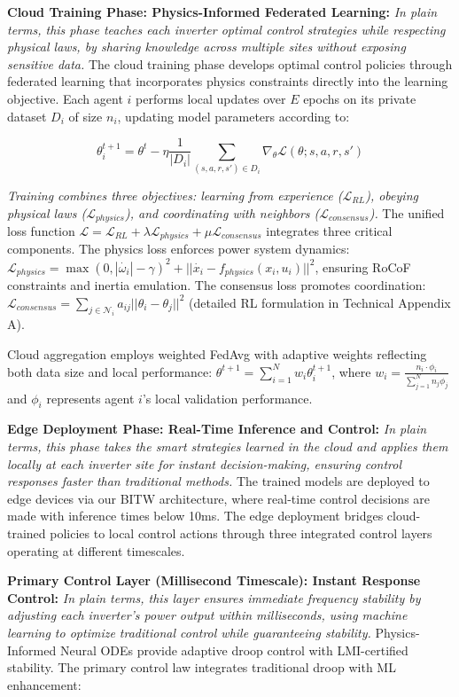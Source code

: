 \documentclass[12pt]{article}
\begin{document}
\textbf{Cloud Training Phase: Physics-Informed Federated Learning:} \textit{In plain terms, this phase teaches each inverter optimal control strategies while respecting physical laws, by sharing knowledge across multiple sites without exposing sensitive data.} The cloud training phase develops optimal control policies through federated learning that incorporates physics constraints directly into the learning objective. Each agent $i$ performs local updates over $E$ epochs on its private dataset $D_i$ of size $n_i$, updating model parameters according to:

$$\theta_i^{t+1} = \theta^t - \eta \frac{1}{|D_i|} \sum_{(s,a,r,s') \in D_i} \nabla_{\theta} \mathcal{L}(\theta; s, a, r, s')$$

\textit{Training combines three objectives: learning from experience ($\mathcal{L}_{RL}$), obeying physical laws ($\mathcal{L}_{physics}$), and coordinating with neighbors ($\mathcal{L}_{consensus}$).} The unified loss function $\mathcal{L} = \mathcal{L}_{RL} + \lambda \mathcal{L}_{physics} + \mu \mathcal{L}_{consensus}$ integrates three critical components. The physics loss enforces power system dynamics: $\mathcal{L}_{physics} = \max(0, |\dot{\omega_i}| - \gamma)^2 + ||\dot{x_i} - f_{physics}(x_i, u_i)||^2$, ensuring RoCoF constraints and inertia emulation. The consensus loss promotes coordination: $\mathcal{L}_{consensus} = \sum_{j \in \mathcal{N}_i} a_{ij} ||\theta_i - \theta_j||^2$ (detailed RL formulation in Technical Appendix A).

Cloud aggregation employs weighted FedAvg with adaptive weights reflecting both data size and local performance: $\theta^{t+1} = \sum_{i=1}^N w_i \theta_i^{t+1}$, where $w_i = \frac{n_i \cdot \phi_i}{\sum_{j=1}^N n_j \phi_j}$ and $\phi_i$ represents agent $i$'s local validation performance.

\textbf{Edge Deployment Phase: Real-Time Inference and Control:} \textit{In plain terms, this phase takes the smart strategies learned in the cloud and applies them locally at each inverter site for instant decision-making, ensuring control responses faster than traditional methods.} The trained models are deployed to edge devices via our BITW architecture, where real-time control decisions are made with inference times below 10ms. The edge deployment bridges cloud-trained policies to local control actions through three integrated control layers operating at different timescales.

\textbf{Primary Control Layer (Millisecond Timescale): Instant Response Control:} \textit{In plain terms, this layer ensures immediate frequency stability by adjusting each inverter's power output within milliseconds, using machine learning to optimize traditional control while guaranteeing stability.} Physics-Informed Neural ODEs provide adaptive droop control with LMI-certified stability. The primary control law integrates traditional droop with ML enhancement:
\end{document}
